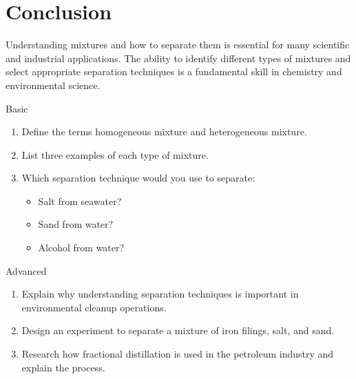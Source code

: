 \section{Conclusion}

Understanding mixtures and how to separate them is essential for many scientific and industrial applications. The ability to identify different types of mixtures and select appropriate separation techniques is a fundamental skill in chemistry and environmental science.

\begin{tieredquestions}{Basic}
\begin{enumerate}
    \item Define the terms homogeneous mixture and heterogeneous mixture.
    \item List three examples of each type of mixture.
    \item Which separation technique would you use to separate:
    \begin{itemize}
        \item Salt from seawater?
        \item Sand from water?
        \item Alcohol from water?
    \end{itemize}
\end{enumerate}
\end{tieredquestions}

\begin{tieredquestions}{Advanced}
\begin{enumerate}
    \item Explain why understanding separation techniques is important in environmental cleanup operations.
    \item Design an experiment to separate a mixture of iron filings, salt, and sand.
    \item Research how fractional distillation is used in the petroleum industry and explain the process.
\end{enumerate}
\end{tieredquestions}

\FloatBarrier %